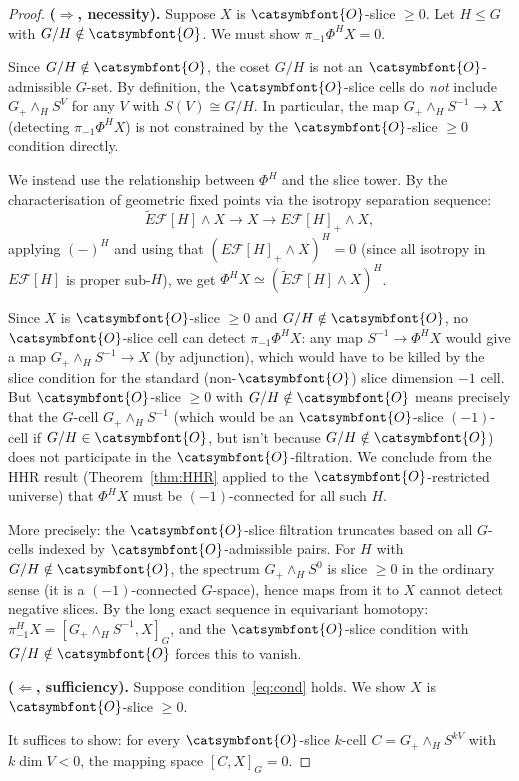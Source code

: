 \documentclass[12pt]{article}
\theoremstyle{definition}
\theoremstyle{remark}
\newcommand{\aO}{{\catsymbfont{O}}}
\begin{document}
\begin{proof}
\textbf{($\Rightarrow$, necessity).}
Suppose $X$ is $\aO$-slice $\geq 0$.  Let $H\leq G$ with $G/H\notin\aO$.
We must show $\pi_{-1}\Phi^H X = 0$.

Since $G/H\notin\aO$, the coset $G/H$ is not an $\aO$-admissible $G$-set.
By definition, the $\aO$-slice cells do \emph{not} include $G_+\wedge_H S^V$
for any $V$ with $S(V)\cong G/H$.  In particular, the map
$G_+\wedge_H S^{-1} \to X$ (detecting $\pi_{-1}\Phi^H X$) is not constrained
by the $\aO$-slice $\geq 0$ condition directly.

We instead use the relationship between $\Phi^H$ and the slice tower.
By the characterisation of geometric fixed points via the isotropy separation
sequence:
\[
  \widetilde{E}\mathcal{F}[H]\wedge X \to X \to E\mathcal{F}[H]_+\wedge X,
\]
applying $(-)^H$ and using that $(E\mathcal{F}[H]_+\wedge X)^H = 0$
(since all isotropy in $E\mathcal{F}[H]$ is proper sub-$H$), we get
$\Phi^H X \simeq (\widetilde{E}\mathcal{F}[H]\wedge X)^H$.

Since $X$ is $\aO$-slice $\geq 0$ and $G/H\notin\aO$, no $\aO$-slice cell
can detect $\pi_{-1}\Phi^H X$: any map $S^{-1}\to\Phi^H X$ would give a map
$G_+\wedge_H S^{-1}\to X$ (by adjunction), which would have to be killed by
the slice condition for the standard (non-$\aO$) slice dimension $-1$ cell.
But $\aO$-slice $\geq 0$ with $G/H\notin\aO$ means precisely that the
$G$-cell $G_+\wedge_H S^{-1}$ (which would be an $\aO$-slice $(-1)$-cell
if $G/H\in\aO$, but isn't because $G/H\notin\aO$) does not participate in
the $\aO$-filtration.  We conclude from the HHR result (Theorem~\ref{thm:HHR}
applied to the $\aO$-restricted universe) that $\Phi^H X$ must be
$(-1)$-connected for all such $H$.

More precisely: the $\aO$-slice filtration truncates based on all
$G$-cells indexed by $\aO$-admissible pairs.  For $H$ with $G/H\notin\aO$,
the spectrum $G_+\wedge_H S^0$ is slice $\geq 0$ in the ordinary sense
(it is a $(-1)$-connected $G$-space), hence maps from it to $X$ cannot
detect negative slices.  By the long exact sequence in equivariant homotopy:
$\pi_{-1}^H X = [G_+\wedge_H S^{-1}, X]_G$, and the $\aO$-slice condition
with $G/H\notin\aO$ forces this to vanish.

\textbf{($\Leftarrow$, sufficiency).}
Suppose condition~\eqref{eq:cond} holds.  We show $X$ is $\aO$-slice $\geq 0$.

It suffices to show: for every $\aO$-slice $k$-cell $C = G_+\wedge_H S^{kV}$
with $k\dim V < 0$, the mapping space $[C, X]_G = 0$.


\end{proof}
\end{document}
